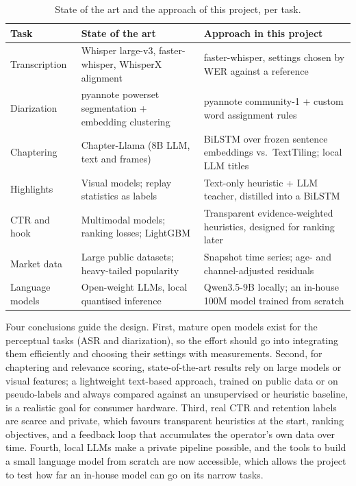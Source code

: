 \begin{table}[H]
\centering
\caption{State of the art and the approach of this project, per task.}
\label{tab:soa-summary}
\small
\begin{tabular}{@{}p{2.6cm}p{5.6cm}p{6.0cm}@{}}
\toprule
\textbf{Task} & \textbf{State of the art} & \textbf{Approach in this project} \\
\midrule
Transcription & Whisper large-v3, faster-whisper, WhisperX alignment & faster-whisper, settings chosen by WER against a reference \\
Diarization & pyannote powerset segmentation + embedding clustering & pyannote community-1 \cite{pyannote_community1} + custom word assignment rules \\
Chaptering & Chapter-Llama (8B LLM, text and frames) & BiLSTM over frozen sentence embeddings vs.\ TextTiling; local LLM titles \\
Highlights & Visual models; replay statistics as labels & Text-only heuristic + LLM teacher, distilled into a BiLSTM \\
CTR and hook & Multimodal models; ranking losses; LightGBM & Transparent evidence-weighted heuristics, designed for ranking later \\
Market data & Large public datasets; heavy-tailed popularity & Snapshot time series; age- and channel-adjusted residuals \\
Language models & Open-weight LLMs, local quantised inference & Qwen3.5-9B locally; an in-house 100M model trained from scratch \\
\bottomrule
\end{tabular}
\end{table}

Four conclusions guide the design. First, mature open models exist for the perceptual tasks (ASR and diarization), so the effort should go into integrating them efficiently and choosing their settings with measurements. Second, for chaptering and relevance scoring, state-of-the-art results rely on large models or visual features; a lightweight text-based approach, trained on public data or on pseudo-labels and always compared against an unsupervised or heuristic baseline, is a realistic goal for consumer hardware. Third, real CTR and retention labels are scarce and private, which favours transparent heuristics at the start, ranking objectives, and a feedback loop that accumulates the operator's own data over time. Fourth, local LLMs make a private pipeline possible, and the tools to build a small language model from scratch are now accessible, which allows the project to test how far an in-house model can go on its narrow tasks.
